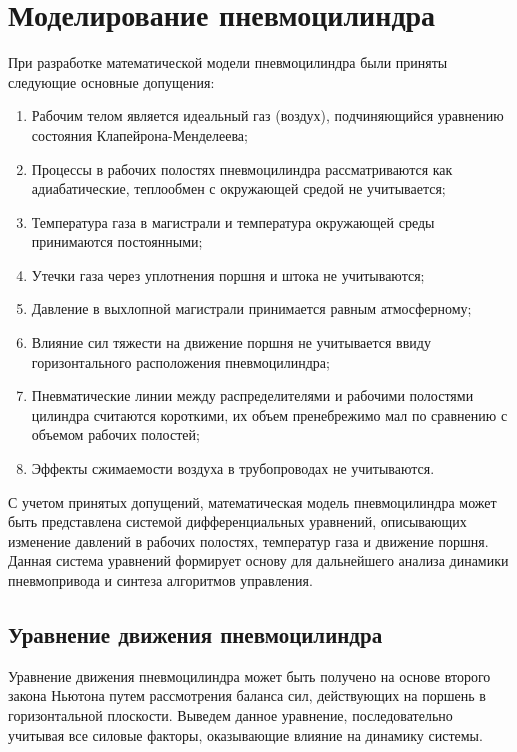 
\section{Моделирование пневмоцилиндра}\label{sec:ch2/sec2}

При разработке математической модели пневмоцилиндра были приняты следующие основные допущения:
\begin{enumerate}
    \item Рабочим телом является идеальный газ (воздух), подчиняющийся уравнению состояния Клапейрона-Менделеева;
    \item Процессы в рабочих полостях пневмоцилиндра рассматриваются как адиабатические, теплообмен с окружающей средой не учитывается;
    \item Температура газа в магистрали и температура окружающей среды принимаются постоянными;
    \item Утечки газа через уплотнения поршня и штока не учитываются;
    \item Давление в выхлопной магистрали принимается равным атмосферному;
    \item Влияние сил тяжести на движение поршня не учитывается ввиду горизонтального расположения пневмоцилиндра;
    \item Пневматические линии между распределителями и рабочими полостями цилиндра считаются короткими,
          их объем пренебрежимо мал по сравнению с объемом рабочих полостей;
    \item Эффекты сжимаемости воздуха в трубопроводах не учитываются.
\end{enumerate}

С учетом принятых допущений, математическая модель пневмоцилиндра может быть представлена системой
дифференциальных уравнений, описывающих изменение давлений в рабочих полостях, температур газа и
движение поршня. Данная система уравнений формирует основу для дальнейшего анализа динамики пневмопривода
и синтеза алгоритмов управления.

\subsection{Уравнение движения пневмоцилиндра}\label{sec:ch2/sec2/subsec1}
Уравнение движения пневмоцилиндра может быть получено на основе второго закона Ньютона путем
рассмотрения баланса сил, действующих на поршень в горизонтальной плоскости. Выведем данное уравнение,
последовательно учитывая все силовые факторы, оказывающие влияние на динамику системы.

